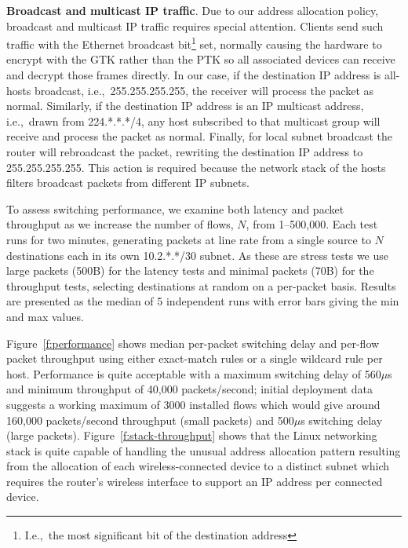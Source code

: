 \textbf{Broadcast and multicast IP traffic}.  Due to our address
allocation policy, broadcast and multicast IP traffic requires special
attention.  Clients send such traffic with the Ethernet broadcast
bit\footnote{I.e.,~the most significant bit of the destination
  address} set, normally causing the hardware to encrypt with the GTK
rather than the PTK so all associated devices can receive and decrypt
those frames directly.  In our case, if the destination IP address is
all-hosts broadcast, i.e.,~255.255.255.255, the receiver will process
the packet as normal.  Similarly, if the destination IP address is an
IP multicast address, i.e.,~drawn from 224.*.*.*/4, any host
subscribed to that multicast group will receive and process the packet
as normal. Finally, for local subnet broadcast the router will
rebroadcast the packet, rewriting the destination IP address to
255.255.255.255. This action is required because the network
stack of the hosts filters broadcast packets from different IP subnets.

To assess switching performance, we examine both latency and packet
throughput as we increase the number of flows, $N$, from 1--500,000.
Each test runs for two minutes, generating packets at line rate from a
single source to $N$ destinations each in its own 10.2.*.*/30 subnet.
As these are stress tests we use large packets (500B) for the latency
tests and minimal packets (70B)
for the throughput tests, selecting
destinations at random on a per-packet basis.  Results are presented
as the median of 5 independent runs with error bars giving the min and
max values. 

Figure~\ref{f:performance} shows median per-packet switching delay and
per-flow packet throughput using either exact-match rules or a single
wildcard rule per host.  Performance is quite acceptable with a
maximum switching delay of 560$\mu$s and minimum throughput of 40,000
packets/second; initial deployment data suggests a working maximum of
3000 installed flows which would give around 160,000 packets/second
throughput (small packets) and 500$\mu$s switching delay (large
packets).  Figure~\ref{f:stack-throughput} shows that the Linux
networking stack is quite capable of handling the unusual address
allocation pattern resulting from the allocation of each
wireless-connected device to a distinct subnet which requires the
router's wireless interface to support an IP address per connected
device. 

